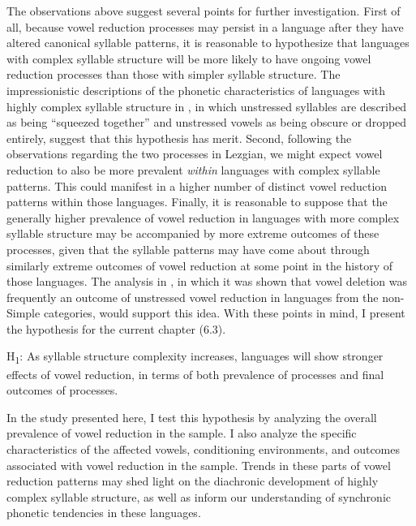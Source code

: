   The observations above suggest several points for further investigation. First of all, because vowel reduction processes may persist in a language after they have altered canonical syllable patterns, it is reasonable to hypothesize that languages with complex syllable structure will be more likely to have ongoing vowel reduction processes than those with simpler syllable structure. The impressionistic descriptions of the phonetic characteristics of languages with highly complex syllable structure in , in which unstressed syllables are described as being “squeezed together” and unstressed vowels as being obscure or dropped entirely, suggest that this hypothesis has merit. Second, following the observations regarding the two processes in Lezgian, we might expect vowel reduction to also be more prevalent \textit{within} languages with complex syllable patterns. This could manifest in a higher number of distinct vowel reduction patterns within those languages. Finally, it is reasonable to suppose that the generally higher prevalence of vowel reduction in languages with more complex syllable structure may be accompanied by more extreme outcomes of these processes, given that the syllable patterns may have come about through similarly extreme outcomes of vowel reduction at some point in the history of those languages. The analysis in , in which it was shown that vowel deletion was frequently an outcome of unstressed vowel reduction in languages from the non-Simple categories, would support this idea. With these points in mind, I present the hypothesis for the current chapter (6.3).



\ea\label{ex:(6.3)}
   H\textsubscript{1}:  As syllable structure complexity increases, languages will show stronger effects of vowel reduction, in terms of both prevalence of processes and final outcomes of processes.

\z


  In the study presented here, I test this hypothesis by analyzing the overall prevalence of vowel reduction in the sample. I also analyze the specific characteristics of the affected vowels, conditioning environments, and outcomes associated with vowel reduction in the sample. Trends in these parts of vowel reduction patterns may shed light on the diachronic development of highly complex syllable structure, as well as inform our understanding of synchronic phonetic tendencies in these languages.



